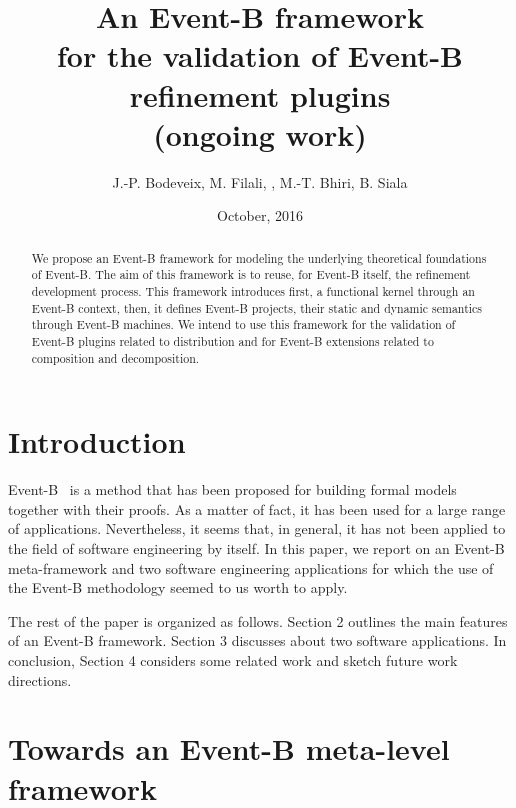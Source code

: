 \documentclass{llncs}
\title{An Event-B framework \\ for the validation of Event-B refinement plugins \\
               (ongoing work) 
        }
\author{J.-P. Bodeveix, M. Filali, , M.-T. Bhiri, B. Siala}
\institute{IRIT CNRS UPS Université de Toulouse \\ 
                Université de Sfax
              }
\date{October, 2016}
\begin{document}
\maketitle


\begin{abstract}
%
 We propose an Event-B framework for modeling the underlying theoretical foundations of Event-B.
The aim of this framework is to reuse, for Event-B itself, the  refinement development process.
This framework introduces first, a functional kernel through an Event-B context, then, it defines Event-B projects, their static and
dynamic semantics through Event-B machines. We intend to use this framework for the validation
of Event-B plugins related to distribution and for Event-B extensions related to composition and
decomposition.
\end{abstract}
\pagestyle{plain} %


%
\section{Introduction}

     Event-B~\cite{Abrial2010} is a method that has been proposed for building formal models together with their proofs.
As a matter of fact, it has been used for a large range of applications. Nevertheless, it
seems that, in general, it has not been applied to the field of software engineering by itself. 
In this paper, we report on an Event-B meta-framework and  two software engineering applications for which the use of the
Event-B methodology seemed to us worth to apply.  

The rest of the paper is organized as follows.  
Section 2 outlines the main features of an Event-B framework. Section 3 discusses about two 
software applications. In conclusion, Section 4 considers some related work and sketch
future work directions.
 

%
\section{Towards an Event-B meta-level framework}
\end{document}
